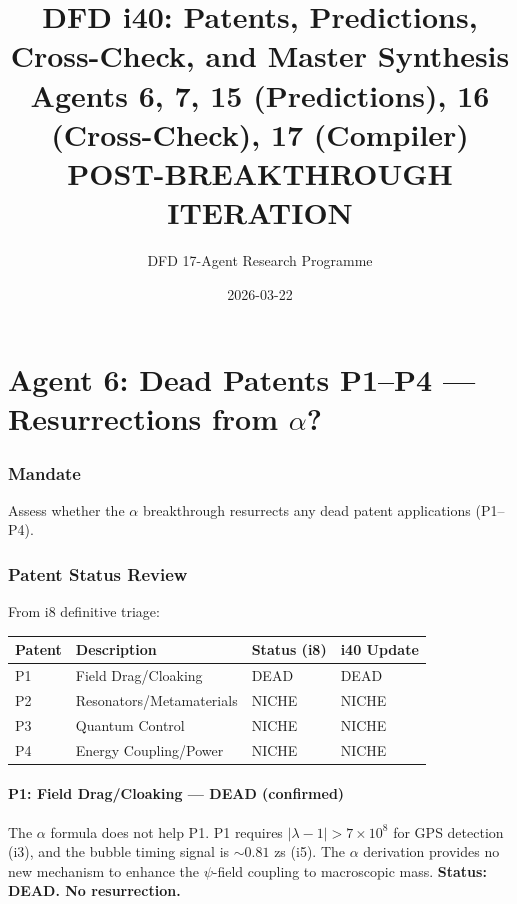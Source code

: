 \documentclass[11pt,a4paper]{article}
\title{DFD i40: Patents, Predictions, Cross-Check, and Master Synthesis\\[6pt]
\large Agents 6, 7, 15 (Predictions), 16 (Cross-Check), 17 (Compiler)\\[6pt]
\normalsize POST-BREAKTHROUGH ITERATION}
\author{DFD 17-Agent Research Programme}
\date{2026-03-22}
\begin{document}
\maketitle
\tableofcontents
\newpage

\part{Agent 6: Dead Patents P1--P4 --- Resurrections from $\alpha$?}
\label{part:agent6}

\section{Mandate}
Assess whether the $\alpha$ breakthrough resurrects any dead patent applications (P1--P4).

\section{Patent Status Review}

From i8 definitive triage:
\begin{center}
\begin{tabular}{llll}
\toprule
\textbf{Patent} & \textbf{Description} & \textbf{Status (i8)} & \textbf{i40 Update} \\
\midrule
P1 & Field Drag/Cloaking & DEAD & DEAD \\
P2 & Resonators/Metamaterials & NICHE & NICHE \\
P3 & Quantum Control & NICHE & NICHE \\
P4 & Energy Coupling/Power & NICHE & NICHE \\
\bottomrule
\end{tabular}
\end{center}

\subsection{P1: Field Drag/Cloaking --- DEAD (confirmed)}

The $\alpha$ formula does not help P1. P1 requires $|\lambda - 1| > 7 \times 10^8$ for GPS detection (i3), and the bubble timing signal is $\sim 0.81$ zs (i5). The $\alpha$ derivation provides no new mechanism to enhance the $\psi$-field coupling to macroscopic mass. \textbf{Status: DEAD. No resurrection.}
\end{document}
